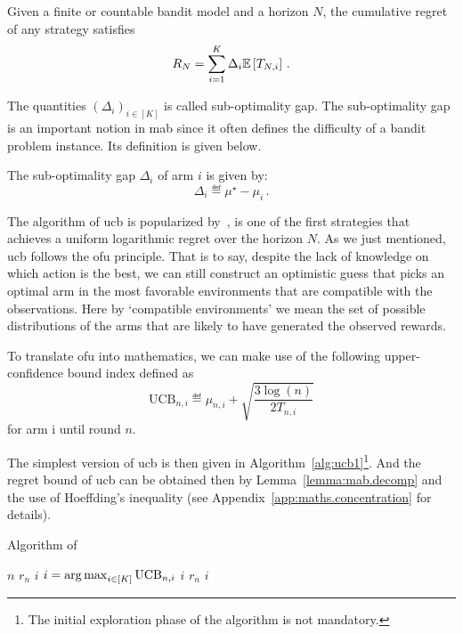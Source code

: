 \begin{lemma}\label{lemma:mab.decomp}
\begin{leftbar}[lemmabar]
Given a finite or countable bandit model and a horizon $N$, the cumulative regret of any strategy satisfies 
\[
    R_N = \sum_{i=1}^K \Delta_i\mathbb{E}\left[T_{N,i}\right]\,.
\]
\end{leftbar}
\end{lemma}

The quantities $(\Delta_i)_{i\in[K]}$ is called \gls{sub-optimality gap}. The sub-optimality gap is an important notion in \gls{mab} since it often defines the difficulty of a bandit problem instance. Its definition is given below.

\begin{definition}\label{def:mab.gap}
\begin{leftbar}[defnbar]
The sub-optimality gap $\Delta_i$ of arm $i$ is given by:
\[
	\Delta_i \eqdef \mu^{\star} - \mu_i\,.
\]
\end{leftbar}
\end{definition}

The algorithm of \gls{ucb} is popularized by~\cite{auer2002ucb}, is one of the first strategies that achieves a uniform logarithmic regret over the horizon $N$. As we just mentioned, \gls{ucb} follows the \gls{ofu} principle. That is to say, despite the lack of knowledge on which action is the best, we can still construct an optimistic guess that picks an optimal arm in the most favorable environments that are compatible with the observations. Here by `compatible environments' we mean the set of possible distributions of the arms that are likely to have generated the observed rewards.

To translate \gls{ofu} into mathematics, we can make use of the following upper-confidence bound index defined as
\[
    \text{UCB}_{n,i} \eqdef \mu_{n,i} + \sqrt{\frac{3\log(n)}{2T_{n,i}}}
\]
for arm i until round $n$.

The simplest version of \gls{ucb} is then given in Algorithm~\ref{alg:ucb1}\footnote{The initial exploration phase of the algorithm is not mandatory.}. And the regret bound of \gls{ucb} can be obtained then by Lemma~\ref{lemma:mab.decomp} and the use of Hoeffding's inequality (see Appendix~\ref{app:maths.concentration} for details).

\begin{algorithm}[ht]
\centering
\caption{Algorithm of \UCB{}}
\label{alg:ucb1}
\footnotesize
\begin{algorithmic}[1]
        \State {} $n$  $r_n$
        \State {} $i$ 
   \EndFor
        \State {} $i = \operatorname*{arg\,max}_{i\in[K]} \text{UCB}_{n,i}$ 
        \State {} $i$  $r_n$
        \State {} $i$ 
   \EndFor
\end{algorithmic}
\end{algorithm}


